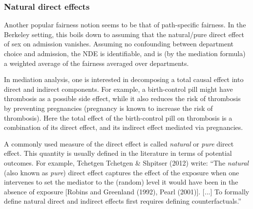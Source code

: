 \subsubsection{Natural direct effects}

Another popular fairness notion seems to be that of path-specific fairness.
In the Berkeley setting, this boils down to assuming that the natural/pure direct effect of sex on admission vanishes.
Assuming no confounding between department choice and admission, the NDE is identifiable, and is (by the mediation formula) a weighted average of the fairness averaged over departments. 

In mediation analysis, one is interested in decomposing a total causal effect into direct and indirect components. 
For example, a birth-control pill might have thrombosis as a possible side effect, while it also reduces the risk of thrombosis by preventing pregnancies (pregnancy is known to increase the risk of thrombosis).
Here the total effect of the birth-control pill on thrombosis is a combination of its direct effect, and its indirect effect mediated via pregnancies.

A commonly used measure of the direct effect is called \emph{natural} or \emph{pure} direct effect.
This quantity is usually defined in the literature in terms of potential outcomes. 
For example, Tchetgen Tchetgen \& Shpitser (2012) write:
``The \emph{natural} (also known as \emph{pure}) direct effect captures the effect of the exposure when one 
intervenes to set the mediator to the (random) level it would have been in the absence of exposure [Robins and Greenland (1992), Pearl (2001)]. 
[...] To formally define natural direct and indirect effects first requires defining counterfactuals.''

